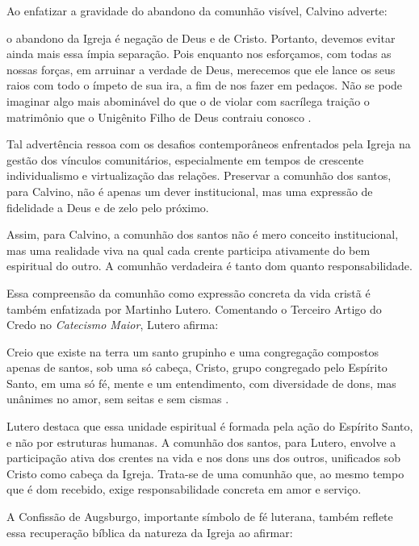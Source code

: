 Ao enfatizar a gravidade do abandono da comunhão visível, Calvino adverte:

\begin{citacao}
    o abandono da Igreja é negação de Deus e de Cristo. Portanto, devemos evitar ainda mais essa ímpia separação. Pois enquanto nos esforçamos, com todas as nossas forças, em arruinar a verdade de Deus, merecemos que ele lance os seus raios com todo o ímpeto de sua ira, a fim de nos fazer em pedaços. Não se pode imaginar algo mais abominável do que o de violar com sacrílega traição o matrimônio que o Unigênito Filho de Deus contraiu conosco \cite[v.~4, pp.~1877-1878]{calvino2022}.
\end{citacao}

Tal advertência ressoa com os desafios contemporâneos enfrentados pela Igreja na gestão dos vínculos comunitários, especialmente em tempos de crescente individualismo e virtualização das relações. Preservar a comunhão dos santos, para Calvino, não é apenas um dever institucional, mas uma expressão de fidelidade a Deus e de zelo pelo próximo.

Assim, para Calvino, a comunhão dos santos não é mero conceito institucional, mas uma realidade viva na qual cada crente participa ativamente do bem espiritual do outro. A comunhão verdadeira é tanto dom quanto responsabilidade.

Essa compreensão da comunhão como expressão concreta da vida cristã é também enfatizada por Martinho Lutero. Comentando o Terceiro Artigo do Credo no \textit{Catecismo Maior}, Lutero afirma:

\begin{citacao}
    Creio que existe na terra um santo grupinho e uma congregação compostos apenas de santos, sob uma só cabeça, Cristo, grupo congregado pelo Espírito Santo, em uma só fé, mente e um entendimento, com diversidade de dons, mas unânimes no amor, sem seitas e sem cismas \cite[p.~454]{livroConcordia}.
\end{citacao}

Lutero destaca que essa unidade espiritual é formada pela ação do Espírito Santo, e não por estruturas humanas. A comunhão dos santos, para Lutero, envolve a participação ativa dos crentes na vida e nos dons uns dos outros, unificados sob Cristo como cabeça da Igreja. Trata-se de uma comunhão que, ao mesmo tempo que é dom recebido, exige responsabilidade concreta em amor e serviço.

A Confissão de Augsburgo, importante símbolo de fé luterana, também reflete essa recuperação bíblica da natureza da Igreja ao afirmar:


